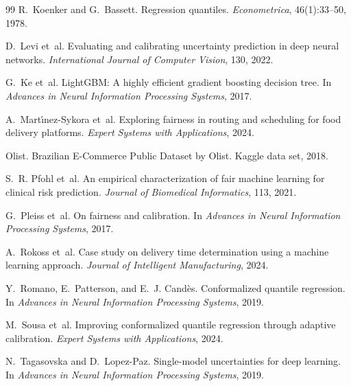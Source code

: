 \documentclass[10pt,twocolumn]{article}
\begin{document}
\begin{thebibliography}{99}
R.~Koenker and G.~Bassett.
\newblock Regression quantiles.
\newblock \emph{Econometrica}, 46(1):33--50, 1978.

D.~Levi et~al.
\newblock Evaluating and calibrating uncertainty prediction in deep neural networks.
\newblock \emph{International Journal of Computer Vision}, 130, 2022.

G.~Ke et~al.
\newblock LightGBM: A highly efficient gradient boosting decision tree.
\newblock In \emph{Advances in Neural Information Processing Systems}, 2017.

A.~Mart{\'\i}nez-Sykora et~al.
\newblock Exploring fairness in routing and scheduling for food delivery platforms.
\newblock \emph{Expert Systems with Applications}, 2024.

Olist.
\newblock Brazilian E-Commerce Public Dataset by Olist.
\newblock Kaggle data set, 2018.

S.~R. Pfohl et~al.
\newblock An empirical characterization of fair machine learning for clinical risk prediction.
\newblock \emph{Journal of Biomedical Informatics}, 113, 2021.

G.~Pleiss et~al.
\newblock On fairness and calibration.
\newblock In \emph{Advances in Neural Information Processing Systems}, 2017.

A.~Rokoss et~al.
\newblock Case study on delivery time determination using a machine learning approach.
\newblock \emph{Journal of Intelligent Manufacturing}, 2024.

Y.~Romano, E.~Patterson, and E.~J. Cand{\`e}s.
\newblock Conformalized quantile regression.
\newblock In \emph{Advances in Neural Information Processing Systems}, 2019.

M.~Sousa et~al.
\newblock Improving conformalized quantile regression through adaptive calibration.
\newblock \emph{Expert Systems with Applications}, 2024.

N.~Tagasovska and D.~Lopez-Paz.
\newblock Single-model uncertainties for deep learning.
\newblock In \emph{Advances in Neural Information Processing Systems}, 2019.


\end{thebibliography}
\end{document}
